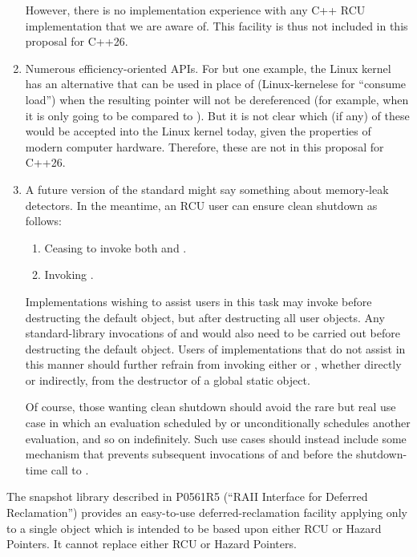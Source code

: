 \begin{enumerate}
	However, there is no implementation experience with any C++
	RCU implementation that we are aware of.
	This facility is thus not included in this proposal for C++26.
\item	Numerous efficiency-oriented APIs.
	For but one example, the Linux kernel has an alternative
	 that can be used in place
	of  (Linux-kernelese for ``consume load'')
	when the resulting pointer will not be dereferenced
	(for example, when it is only going to be compared to ).
	But it is not clear which (if any) of these would be accepted
	into the Linux kernel today, given the properties of modern
	computer hardware.
	Therefore, these are not in this proposal for C++26.
\item	A future version of the standard might say something about
	memory-leak detectors.
	In the meantime, an RCU user can ensure clean shutdown as follows:
	\begin{enumerate}
	\item	Ceasing to invoke both  and
		.
	\item	Invoking .
	\end{enumerate}
	Implementations wishing to assist users in this task may
	invoke  before destructing the default
	 object, but after destructing all user objects.
	Any standard-library invocations of  and
	 would also need to be carried out before
	destructing the default  object.
	Users of implementations that do not assist in this manner
	should further refrain from invoking either 
	or , whether directly or indirectly, from the
	destructor of a global static object.

	Of course, those wanting clean shutdown should avoid the rare
	but real use case in which an evaluation scheduled by
	 or  unconditionally
	schedules another evaluation, and so on indefinitely.
	Such use cases should instead include some mechanism that prevents
	subsequent invocations of  and 
	before the shutdown-time call to .
\end{enumerate}

The snapshot library described in P0561R5 (``RAII Interface for Deferred
Reclamation'') provides an easy-to-use deferred-reclamation facility
applying only to a single object which is intended to be based upon
either RCU or Hazard Pointers.
It cannot replace either RCU or Hazard Pointers.

